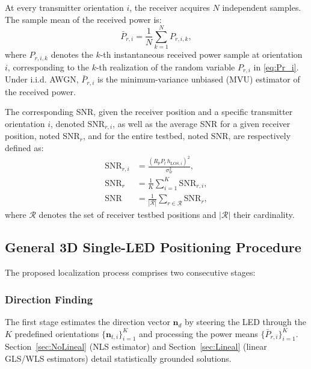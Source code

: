\documentclass[journal]{IEEEtran}
\newcommand{\added}[1]{{\color{blue}#1}}
\begin{document}
At every transmitter orientation \(i\), the receiver acquires \(N\) independent samples. The sample mean of the received power is:
\begin{equation}
\bar P_{r,i}=\frac{1}{N}\sum_{k=1}^{N} P_{r,i,k},
\label{eq:sampleMean}
\end{equation}
where \(P_{r,i,k}\) denotes the \(k\)-th instantaneous received power sample at orientation \(i\), corresponding to the \(k\)-th realization of the random variable \(P_{r,i}\) in \eqref{eq:Pr_i}. Under i.i.d. AWGN, \(\bar P_{r,i}\) is the minimum-variance unbiased (MVU) estimator of the received power.

The corresponding SNR, given the receiver position and a specific transmitter orientation \(i\), denoted $\mathrm{SNR}_{r,i}$, as well as the average SNR for a given receiver position, noted $\mathrm{SNR}_{r}$, and for the entire testbed, noted $\mathrm{SNR}$, are respectively defined as:
\begin{subequations}\label{eq:SNR}
\begin{align}
\mathrm{SNR}_{r,i} &= \frac{(R_pP_{t}\,h_{\text{LOS},i})^2}{\sigma_{w}^{2}}, \label{eq:SNRa} \\
\mathrm{SNR}_{r} &= \frac{1}{K}\sum_{i=1}^{K}\mathrm{SNR}_{r,i}, \label{eq:SNRb} \\
\mathrm{SNR} &= \frac{1}{|\mathcal{R}|}\sum_{r\in\mathcal{R}}{\mathrm{SNR}}_{r}, \label{eq:SNRc}
\end{align}
\end{subequations}
where \(\mathcal{R}\) denotes the set of receiver testbed positions and $|\mathcal R|$ their cardinality. 


\subsection{General 3D Single-LED Positioning Procedure}

The proposed localization process comprises two consecutive stages:

\subsubsection{Direction Finding}

The first stage estimates the direction vector \(\mathbf{n}_{d}\) by steering the LED through the \(K\) predefined orientations \(\{\mathbf{n}_{t,i}\}_{i=1}^{K}\) and processing the power means \(\{\bar P_{r,i}\}_{i=1}^{K}\). Section~\ref{sec:NoLineal} (\added{NLS} estimator) and Section~\ref{sec:Lineal} (linear GLS/WLS estimators) detail statistically grounded solutions.
\end{document}
